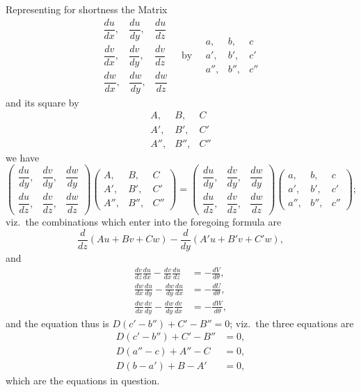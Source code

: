 \documentclass[11pt,a4paper]{book}
\begin{document}
Representing for shortness the Matrix
\[
\begin{matrix}
\dfrac{du}{dx}, & \dfrac{du}{dy}, & \dfrac{du}{dz} \\[1em]
\dfrac{dv}{dx}, & \dfrac{dv}{dy}, & \dfrac{dv}{dz} \\[1em]
\dfrac{dw}{dx}, & \dfrac{dw}{dy}, & \dfrac{dw}{dz}
\end{matrix}
\quad\text{by}\quad
\begin{matrix}
a, & b, & c \\
a', & b', & c' \\
a'', & b'', & c''
\end{matrix}
\]
and its square by
\[
\begin{matrix}
A, & B, & C \\
A', & B', & C' \\
A'', & B'', & C''
\end{matrix}
\]
we have
\[
\begin{pmatrix}
\dfrac{du}{dy}, & \dfrac{dv}{dy}, & \dfrac{dw}{dy} \\
\dfrac{du}{dz}, & \dfrac{dv}{dz}, & \dfrac{dw}{dz}
\end{pmatrix}
\begin{pmatrix}
A, & B, & C \\
A', & B', & C' \\
A'', & B'', & C''
\end{pmatrix}
=
\begin{pmatrix}
\dfrac{du}{dy}, & \dfrac{dv}{dy}, & \dfrac{dw}{dy} \\
\dfrac{du}{dz}, & \dfrac{dv}{dz}, & \dfrac{dw}{dz}
\end{pmatrix}
\begin{pmatrix}
a, & b, & c \\
a', & b', & c' \\
a'', & b'', & c''
\end{pmatrix};
\]
viz.\ the combinations which enter into the foregoing formula are
\[
\frac{d}{dz}(Au + Bv + Cw) - \frac{d}{dy}(A'u + B'v + C'w),
\]
and
\begin{align*}
\frac{dv}{dz}\frac{du}{dx} - \frac{dv}{dx}\frac{du}{dz} &= -\frac{dV}{d\theta}, \\
\frac{dw}{dx}\frac{du}{dy} - \frac{dw}{dy}\frac{du}{dx} &= -\frac{dU}{d\theta}, \\
\frac{dw}{dx}\frac{dv}{dy} - \frac{dw}{dy}\frac{dv}{dx} &= -\frac{dW}{d\theta},
\end{align*}
and the equation thus is $D(c' - b'') + C' - B'' = 0$; viz.\ the three equations are
\begin{align*}
D(c' - b'') + C' - B'' &= 0, \\
D(a'' - c) + A'' - C &= 0, \\
D(b - a') + B - A' &= 0,
\end{align*}
which are the equations in question.
\end{document}
